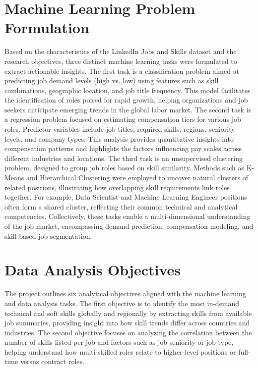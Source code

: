 \documentclass[conference]{IEEEtran}
\begin{document}
\section{Machine Learning Problem Formulation}
Based on the characteristics of the LinkedIn Jobs and Skills dataset and the research objectives, three distinct machine learning tasks were formulated to extract actionable insights.
The first task is a classification problem aimed at predicting job demand levels (high vs. low) using features such as skill combinations, geographic location, and job title frequency. This model facilitates the identification of roles poised for rapid growth, helping organizations and job seekers anticipate emerging trends in the global labor market.
The second task is a regression problem focused on estimating compensation tiers for various job roles. Predictor variables include job titles, required skills, regions, seniority levels, and company types. This analysis provides quantitative insights into compensation patterns and highlights the factors influencing pay scales across different industries and locations.
The third task is an unsupervised clustering problem, designed to group job roles based on skill similarity. Methods such as K-Means and Hierarchical Clustering were employed to uncover natural clusters of related positions, illustrating how overlapping skill requirements link roles together. For example, Data Scientist and Machine Learning Engineer positions often form a shared cluster, reflecting their common technical and analytical competencies.
Collectively, these tasks enable a multi-dimensional understanding of the job market, encompassing demand prediction, compensation modeling, and skill-based job segmentation.

\section{Data Analysis Objectives}
The project outlines six analytical objectives aligned with the machine learning and data analysis tasks. The first objective is to identify the most in-demand technical and soft skills globally and regionally by extracting skills from available job summaries, providing insight into how skill trends differ across countries and industries. The second objective focuses on analyzing the correlation between the number of skills listed per job and factors such as job seniority or job type, helping understand how multi-skilled roles relate to higher-level positions or full-time versus contract roles.
\end{document}
